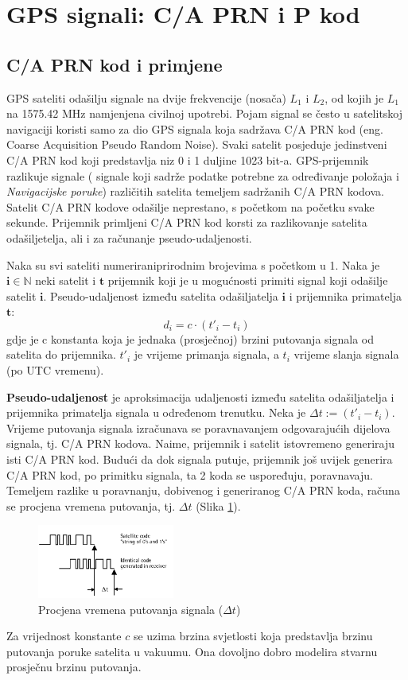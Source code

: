 \documentclass[a4paper,twoside,12pt]{memoir} %
\begin{document}
	\section[C/A PRN kod]{GPS signali: C/A PRN i P kod}
	\subsection{C/A PRN kod i primjene}\label{CAkod}
	GPS sateliti odašilju signale na dvije frekvencije (nosača) $L_1$ i $L_2$, od kojih je $L_1$ na 1575.42 MHz namjenjena civilnoj upotrebi. Pojam signal se često u satelitskoj navigaciji
	koristi samo za dio GPS signala koja sadržava C/A PRN kod (eng. Coarse Acquisition Pseudo Random Noise). 
	Svaki satelit posjeduje jedinstveni C/A PRN kod koji predstavlja niz 0 i 1 duljine 1023 bit-a.
	GPS-prijemnik razlikuje signale ( signale koji sadrže podatke potrebne za određivanje položaja i \textit{Navigacijske poruke}) različitih satelita
	temeljem sadržanih C/A PRN kodova. Satelit C/A PRN kodove odašilje neprestano, s početkom na početku svake sekunde. Prijemnik primljeni C/A PRN kod korsti za 
	razlikovanje satelita odašiljetelja, ali i za računanje pseudo-udaljenosti.
	
	\begin{defn}
		Naka su svi sateliti numeriraniprirodnim  brojevima s početkom 
		u 1. Naka je $\mathbf{i} \in \mathbb{N}$ neki satelit i $\mathbf{t}$ prijemnik
		koji je u mogućnosti primiti signal koji odašilje satelit $\mathbf{i}$. Pseudo-udaljenost
		između satelita odašiljatelja $\mathbf{i}$ i prijemnika primatelja $\textbf{t}$:
		$$d_i = c\cdot(t'_i- t_i)$$
		gdje je c konstanta koja je jednaka (prosječnoj) brzini putovanja signala od satelita do prijemnika. $t'_i$ je vrijeme primanja signala, a $t_i$ vrijeme slanja signala
		(po UTC vremenu).
	\end{defn}
	\textbf{Pseudo-udaljenost} je aproksimacija udaljenosti između satelita odašiljatelja i prijemnika primatelja signala u određenom trenutku.
	Neka je $\Delta t := (t'_i- t_i)$. Vrijeme putovanja signala izračunava se poravnavanjem odgovarajućih dijelova signala, tj. C/A PRN kodova.
	Naime, prijemnik i satelit istovremeno generiraju isti C/A PRN kod. Budući da 
	dok signala putuje, prijemnik još uvijek generira C/A PRN kod, po primitku signala,
	ta 2 koda se uspoređuju, poravnavaju. Temeljem razlike u poravnanju, dobivenog i generiranog C/A PRN koda,
	računa se procjena vremena putovanja, tj. $\Delta t$ (Slika \ref{fig:deltat}).
	\begin{figure}[H]
		\centering
		\includegraphics[width=0.4\textwidth]{deltat}
		\caption{Procjena vremena putovanja signala ($\Delta t$)}
		\label{fig:deltat}
	\end{figure}
	Za vrijednost konstante $c$ se uzima brzina svjetlosti koja predstavlja brzinu putovanja poruke satelita u vakuumu. Ona dovoljno dobro modelira stvarnu prosječnu brzinu putovanja.
	
\end{document}
